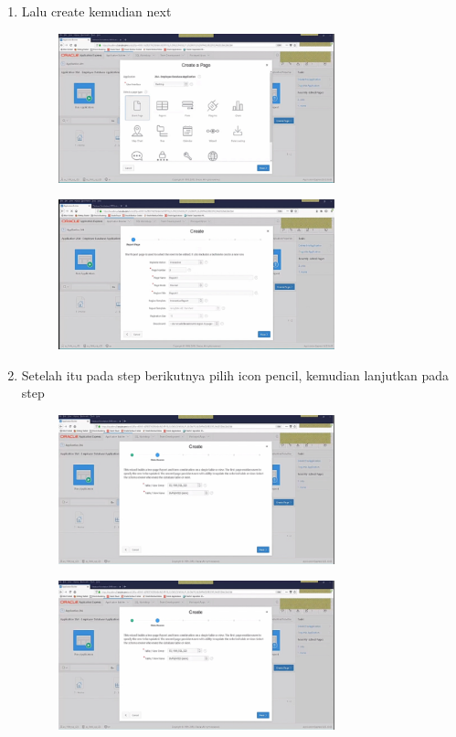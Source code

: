\documentclass{article}
\begin{document}
\begin{enumerate}
\item  Lalu create  kemudian next
\begin{figure}[h]
\centerline{\includegraphics[width=8cm]{figure/P1.png}}
\end{figure}
\begin{figure}[h]
\centerline{\includegraphics[width=8cm]{figure/P2.png}}
            \end{figure}
\newpage\item  Setelah itu pada step berikutnya pilih icon pencil, kemudian lanjutkan pada step 
\begin{figure}[h]
\centerline{\includegraphics[width=8cm]{figure/Q1.png}}
            \end{figure}
            \begin{figure}[h]
\centerline{\includegraphics[width=8cm]{figure/Q1.png}}

\end{figure}
\end{enumerate}
\end{document}
